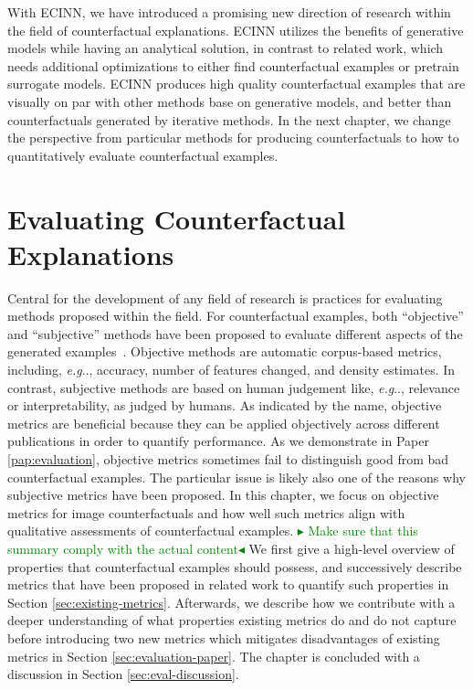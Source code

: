 \documentclass[11pt,a4paper,twoside,openright,final]{memoir}
\makeatletter
\def\ifdraft{\ifdim\overfullrule>\z@
  \expandafter\@firstoftwo\else\expandafter\@secondoftwo\fi}
\newcommand{\frederik}[1]{{
    \ifdraft{
        \textcolor{green}{\textbf{$\blacktriangleright$} #1\textbf{$\blacktriangleleft$}}
    }{}}}
\DeclareRobustCommand\onedot{\futurelet\@let@token\@onedot}
\def\@onedot{\ifx\@let@token.\else.\null\fi\xspace}
\def\eg{\emph{e.g}\onedot} \def\Eg{\emph{E.g}\onedot}
\newcommand*{\paperref}[1]{Paper \hyperref[#1]{\ref{#1}}}
\makeatother
\begin{document}
With ECINN, we have introduced a promising new direction of research within the field of counterfactual explanations. 
ECINN utilizes the benefits of generative models while having an analytical solution, in contrast to related work, which needs additional optimizations to either find counterfactual examples or pretrain surrogate models.
ECINN produces high quality counterfactual examples that are visually on par with other methods base on generative models, and better than counterfactuals generated by iterative methods.
In the next chapter, we change the perspective from particular methods for producing counterfactuals to how to quantitatively evaluate counterfactual examples. 


\chapter{Evaluating Counterfactual Explanations}\label{chap:evaluation}
Central for the development of any field of research is practices for evaluating methods proposed within the field.
For counterfactual examples, both ``objective'' and ``subjective'' methods have been proposed to evaluate different aspects of the generated examples~\cite{Stepin2021}.
Objective methods are automatic corpus-based metrics, including, \eg, accuracy, number of features changed, and density estimates.
In contrast, subjective methods are based on human judgement like, \eg, relevance or interpretability, as judged by humans.
As indicated by the name, objective metrics are beneficial because they can be applied objectively across different publications in order to quantify performance.
As we demonstrate in \paperref{pap:evaluation}, objective metrics sometimes fail to distinguish good from bad counterfactual examples.
The particular issue is likely also one of the reasons why subjective metrics have been proposed.
In this chapter, we focus on objective metrics for image counterfactuals and how well such metrics align with qualitative assessments of counterfactual examples. 
\frederik{Make sure that this summary comply with the actual content} 
We first give a high-level overview of properties that counterfactual examples should possess, and successively describe metrics that have been proposed in related work to quantify such properties in Section \ref{sec:existing-metrics}.
Afterwards, we describe how we contribute with a deeper understanding of what properties existing metrics do and do not capture before introducing two new metrics which mitigates disadvantages of existing metrics in Section \ref{sec:evaluation-paper}.
The chapter is concluded with a discussion in Section \ref{sec:eval-discussion}.
\end{document}
